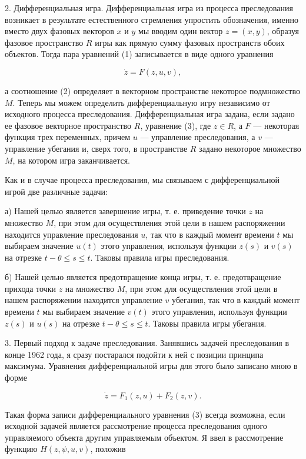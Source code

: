 \documentclass[10pt]{article}
\begin{document}
2. Дифференциальная игра. Дифференциальная игра из процесса преследования возникает в результате естественного стремления упростить обозначения, именно вместо двух фазовых векторов \(x\) и \(y\) мы вводим один вектор \(z = \left( {x,y}\right)\), образуя фазовое пространство \(R\) игры как прямую сумму фазовых пространств обоих объектов. Тогда пара уравнений (1) записывается в виде одного уравнения

\[
\dot{z} = F\left( {z,u,v}\right), \tag{3}
\]

а соотношение (2) определяет в векторном пространстве некоторое подмножество \(M\). Теперь мы можем определить дифференциальную игру независимо от исходного процесса преследования. Дифференциальная игра задана, если задано ее фазовое векторное пространство \(R\), уравнение (3), где \(z \in  R\), а \(F\) — некоторая функция трех переменных, причем \(u\) — управление преследования, а \(v\) — управление убегания и, сверх того, в пространстве \(R\) задано некоторое множество \(M\), на котором игра заканчивается.

Как и в случае процесса преследования, мы связываем с дифференциальной игрой две различные задачи:

а) Нашей целью является завершение игры, т. е. приведение точки \(z\) на множество \(M\), при этом для осуществления этой цели в нашем распоряжении находится управление преследования \(u\), так что в каждый момент времени \(t\) мы выбираем значение \(u\left( t\right)\) этого управления, используя функции \(z\left( s\right)\) и \(v\left( s\right)\) на отрезке \(t - \theta  \leq  s \leq  t\). Таковы правила игры преследования.

б) Нашей целью является предотвращение конца игры, т. е. предотвращение прихода точки \(z\) на множество \(M\), при этом для осуществления этой цели в нашем распоряжении находится управление \(v\) убегания, так что в каждый момент времени \(t\) мы выбираем значение \(v\left( t\right)\) этого управления, используя функции \(z\left( s\right)\) и \(u\left( s\right)\) на отрезке \(t - \theta  \leq  s \leq  t\). Таковы правила игры убегания.

3. Первый подход к задаче преследования. Занявшись задачей преследования в конце 1962 года, я сразу постарался подойти к ней с позиции принципа максимума. Уравнения дифференциальной игры для этого было записано мною в форме

\[
\dot{z} = {F}_{1}\left( {z,u}\right)  + {F}_{2}\left( {z,v}\right). \tag{4}
\]

Такая форма записи дифференциального уравнения (3) всегда возможна, если исходной задачей является рассмотрение процесса преследования одного управляемого объекта другим управляемым объектом. Я ввел в рассмотрение функцию \(H\left( {z,\psi,u,v}\right)\), положив
\end{document}
